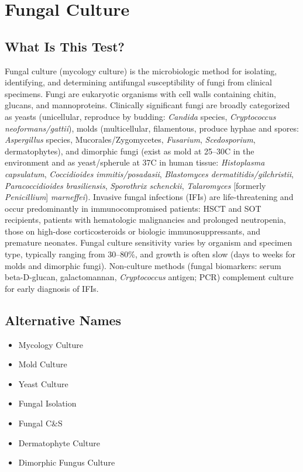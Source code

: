 \chapter{Fungal Culture}

\section*{What Is This Test?}
Fungal culture (mycology culture) is the microbiologic method for isolating, identifying, and determining antifungal susceptibility of fungi from clinical specimens. Fungi are eukaryotic organisms with cell walls containing chitin, glucans, and mannoproteins. Clinically significant fungi are broadly categorized as yeasts (unicellular, reproduce by budding: \textit{Candida} species, \textit{Cryptococcus neoformans/gattii}), molds (multicellular, filamentous, produce hyphae and spores: \textit{Aspergillus} species, Mucorales/Zygomycetes, \textit{Fusarium}, \textit{Scedosporium}, dermatophytes), and dimorphic fungi (exist as mold at 25--30\textdegree{}C in the environment and as yeast/spherule at 37\textdegree{}C in human tissue: \textit{Histoplasma capsulatum}, \textit{Coccidioides immitis/posadasii}, \textit{Blastomyces dermatitidis/gilchristii}, \textit{Paracoccidioides brasiliensis}, \textit{Sporothrix schenckii}, \textit{Talaromyces} [formerly \textit{Penicillium}] \textit{marneffei}). Invasive fungal infections (IFIs) are life-threatening and occur predominantly in immunocompromised patients: HSCT and SOT recipients, patients with hematologic malignancies and prolonged neutropenia, those on high-dose corticosteroids or biologic immunosuppressants, and premature neonates. Fungal culture sensitivity varies by organism and specimen type, typically ranging from 30--80\%, and growth is often slow (days to weeks for molds and dimorphic fungi). Non-culture methods (fungal biomarkers: serum beta-D-glucan, galactomannan, \textit{Cryptococcus} antigen; PCR) complement culture for early diagnosis of IFIs.

\section*{Alternative Names}
\begin{itemize}
  \item Mycology Culture
  \item Mold Culture
  \item Yeast Culture
  \item Fungal Isolation
  \item Fungal C\&S
  \item Dermatophyte Culture
  \item Dimorphic Fungus Culture
\end{itemize}
